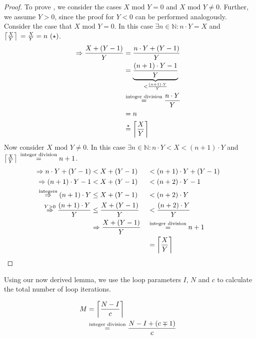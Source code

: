 \begin{proof}
    To prove , we consider the cases $X \text{ mod } Y = 0$ and $X \text{ mod } Y \neq 0$.
    Further, we assume $Y > 0$, since the proof for $Y < 0$ can be performed analogously.
    Consider the case that $X \text{ mod } Y = 0$.
    In this case $\exists n \in \mathbb{N}: n \cdot Y = X$ and $\left\lceil{}\frac{X}{Y}\right\rceil{} = \frac{X}{Y} = n~(\star)$.
    \begin{align*}
        \Rightarrow \frac{X + (Y - 1)}{Y} &= \frac{n \cdot Y + (Y - 1)}{Y}\\
        &=\underbrace{\frac{(n + 1) \cdot Y - 1}{Y}}_{< \frac{(n + 1) \cdot Y}{Y}}\\
        &\overset{\text{integer division}}{=} \frac{n \cdot Y}{Y}\\
        &= n\\
        &\overset{\star}{=} \left\lceil{}\frac{X}{Y}\right\rceil{}
    \end{align*}
    Now consider $X \text{ mod } Y \neq 0$.
    In this case $\exists n \in \mathbb{N}: n \cdot Y < X < (n + 1) \cdot Y$ and $\left\lceil{}\frac{X}{Y}\right\rceil{} \overset{\text{integer division}}{=} n + 1$.
    \begin{alignat*}{2}
        \Rightarrow n \cdot Y + (Y - 1) &< X + (Y - 1) &&< (n + 1) \cdot Y + (Y - 1)\\
        \Rightarrow (n + 1) \cdot Y - 1&< X + (Y - 1) &&< (n + 2) \cdot Y - 1\\
        \overset{\text{integers}}{\Rightarrow}  (n + 1) \cdot Y &\leq X + (Y - 1) &&< (n + 2) \cdot Y\\
        \overset{Y > 0}{\Rightarrow} \frac{(n + 1) \cdot Y}{Y} &\leq \frac{X + (Y - 1)}{Y} &&< \frac{(n + 2) \cdot Y}{Y}\\
        &\Rightarrow \frac{X + (Y - 1)}{Y} &&\overset{\text{integer division}}= n + 1\\
        & &&= \left\lceil{}\frac{X}{Y}\right\rceil{}
    \end{alignat*}
\end{proof}

Using our now derived lemma, we use the loop parameters $I$, $N$ and $c$ to calculate the total number of loop iterations.

\begin{equation}\label{eqn:impl:fixup:duff:total-iteration-based-on-bounds}
\begin{aligned}
    M &= \left\lceil{}\frac{N - I}{c}\right\rceil{} \\
    & \overset{\text{integer division}}{=} \frac{N - I + (c \mp 1)}{c}
\end{aligned}
\end{equation}

